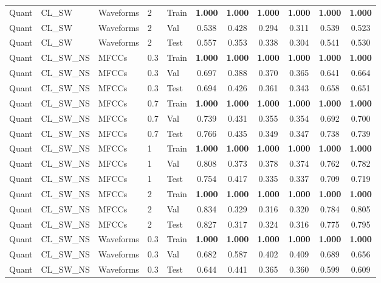 \begin{landscape}
\begin{longtable}{|l|l|l|l|l|c|c|c|c|c|c|}
Quant & CL\_SW & Waveforms & 2 & Train & \textbf{1.000} & \textbf{1.000} & \textbf{1.000} & \textbf{1.000} & \textbf{1.000} & \textbf{1.000} \\
Quant & CL\_SW & Waveforms & 2 & Val & 0.538 & 0.428 & 0.294 & 0.311 & 0.539 & 0.523 \\
Quant & CL\_SW & Waveforms & 2 & Test & 0.557 & 0.353 & 0.338 & 0.304 & 0.541 & 0.530 \\
Quant & CL\_SW\_NS & MFCCs & 0.3 & Train & \textbf{1.000} & \textbf{1.000} & \textbf{1.000} & \textbf{1.000} & \textbf{1.000} & \textbf{1.000} \\
Quant & CL\_SW\_NS & MFCCs & 0.3 & Val & 0.697 & 0.388 & 0.370 & 0.365 & 0.641 & 0.664 \\
Quant & CL\_SW\_NS & MFCCs & 0.3 & Test & 0.694 & 0.426 & 0.361 & 0.343 & 0.658 & 0.651 \\
Quant & CL\_SW\_NS & MFCCs & 0.7 & Train & \textbf{1.000} & \textbf{1.000} & \textbf{1.000} & \textbf{1.000} & \textbf{1.000} & \textbf{1.000} \\
Quant & CL\_SW\_NS & MFCCs & 0.7 & Val & 0.739 & 0.431 & 0.355 & 0.354 & 0.692 & 0.700 \\
Quant & CL\_SW\_NS & MFCCs & 0.7 & Test & 0.766 & 0.435 & 0.349 & 0.347 & 0.738 & 0.739 \\
Quant & CL\_SW\_NS & MFCCs & 1 & Train & \textbf{1.000} & \textbf{1.000} & \textbf{1.000} & \textbf{1.000} & \textbf{1.000} & \textbf{1.000} \\
Quant & CL\_SW\_NS & MFCCs & 1 & Val & 0.808 & 0.373 & 0.378 & 0.374 & 0.762 & 0.782 \\
Quant & CL\_SW\_NS & MFCCs & 1 & Test & 0.754 & 0.417 & 0.335 & 0.337 & 0.709 & 0.719 \\
Quant & CL\_SW\_NS & MFCCs & 2 & Train & \textbf{1.000} & \textbf{1.000} & \textbf{1.000} & \textbf{1.000} & \textbf{1.000} & \textbf{1.000} \\
Quant & CL\_SW\_NS & MFCCs & 2 & Val & 0.834 & 0.329 & 0.316 & 0.320 & 0.784 & 0.805 \\
Quant & CL\_SW\_NS & MFCCs & 2 & Test & 0.827 & 0.317 & 0.324 & 0.316 & 0.775 & 0.795 \\
Quant & CL\_SW\_NS & Waveforms & 0.3 & Train & \textbf{1.000} & \textbf{1.000} & \textbf{1.000} & \textbf{1.000} & \textbf{1.000} & \textbf{1.000} \\
Quant & CL\_SW\_NS & Waveforms & 0.3 & Val & 0.682 & 0.587 & 0.402 & 0.409 & 0.689 & 0.656 \\
Quant & CL\_SW\_NS & Waveforms & 0.3 & Test & 0.644 & 0.441 & 0.365 & 0.360 & 0.599 & 0.609 \\

\end{longtable}
\end{landscape}
